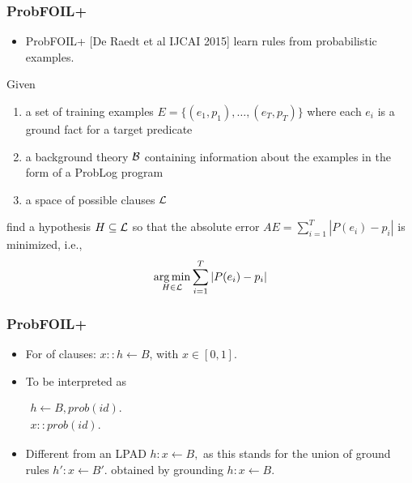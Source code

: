 \documentclass[trans,aspectratio=1610]{beamer}
\DeclareMathOperator*{\argmin}{arg\,min}
\newcommand{\lpif}{\leftarrow}
\newcommand\cB{{\cal B}}
\newcommand\cL{{\cal L}}
\begin{document}
%
%
%
%
%
\begin{frame}
\frametitle{ProbFOIL+}
\begin{itemize}
\item 
ProbFOIL+ [De Raedt et al IJCAI 2015] learn rules from probabilistic examples. 
\end{itemize}
\begin{definition}
Given
\begin{enumerate}
\item
a set of training examples $E=\{(e_1, p_1),\ldots,(e_T,p_T)\}$ where each $e_i$ is a 
ground fact for a target predicate
\item a background theory $\cB$ containing information about the examples in the form 
of  
a ProbLog program
\item a space of possible clauses $\cL$
\end{enumerate}
find a hypothesis $H\subseteq \cL$ so that the absolute error 
$AE=\sum_{i=1}^T|P(e_i)-p_i|$
is minimized, i.e.,
$$\argmin_{H\in\cL}\sum_{i=1}^T|P(e_i)-p_i|$$
\end{definition}
\end{frame}
\begin{frame}
\frametitle{ProbFOIL+}
\begin{itemize}
\item 
For of clauses: $x::h\lpif B$,
with $x\in[0,1]$. 
\item To be interpreted as

$\begin{array}{l}
h\lpif B, prob(id).\\
x::prob(id).
\end{array}$
\item Different from an LPAD
$h:x\lpif B,$ as this stands for the union of ground rules $h':x\lpif B'.$ obtained by grounding
 $h:x\lpif B.$
\end{itemize}
\end{frame}
\end{document}
